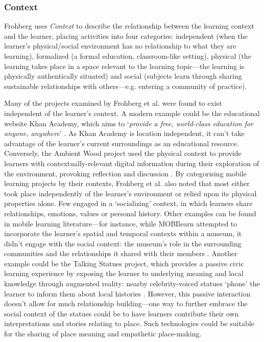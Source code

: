 \subsubsection{Context}
Frohberg uses \textit{Context} to describe the relationship between the learning context and the learner, placing activities into four categories: independent (when the learner's physical/social environment has no relationship to what they are learning), formalized (a formal education, classroom-like setting), physical (the learning takes place in a space relevant to the learning topic---the learning is physically authentically situated) and social (subjects learn through sharing sustainable relationships with others---e.g. entering a community of practice). 

Many of the projects examined by Frohberg et al. were found to exist independent of the learner’s context. A modern example could be the educational website Khan Academy, which aims to ‘\textit{provide a free, world-class education for anyone, anywhere}’ \citep{Khan2011}. As Khan Academy is location independent, it can’t take advantage of the learner’s current surroundings as an educational resource. Conversely, the Ambient Wood project used the physical context to provide learners with contextually-relevant digital information during their exploration of the environment, provoking reflection and discussion \citep{Rogers2004}. By categorising mobile learning projects by their contexts, Frohberg et al. also noted that most either took place independently of the learner’s environment or relied upon its physical properties alone. Few engaged in a `socializing' context, in which learners share relationships, emotions, values or personal history. Other examples can be found in mobile learning literature---for instance, while MOBIlearn attempted to incorporate the learner’s spatial and temporal contexts within a museum, it didn't engage with the social context: the museum’s role in the surrounding communities and the relationships it shared with their members \citep{Lonsdale2004}. Another example could be the Talking Statues project, which provides a passive civic learning experience by exposing the learner to underlying meaning and local knowledge through augmented reality: nearby celebrity-voiced statues ‘phone’ the learner to inform them about local histories \citep{Sing2017}. However, this passive interaction doesn't allow for much relationship building---one way to further embrace the social context of the statues could be to have learners contribute their own interpretations and stories relating to place. Such technologies could be suitable for the sharing of place meaning and empathetic place-making.

